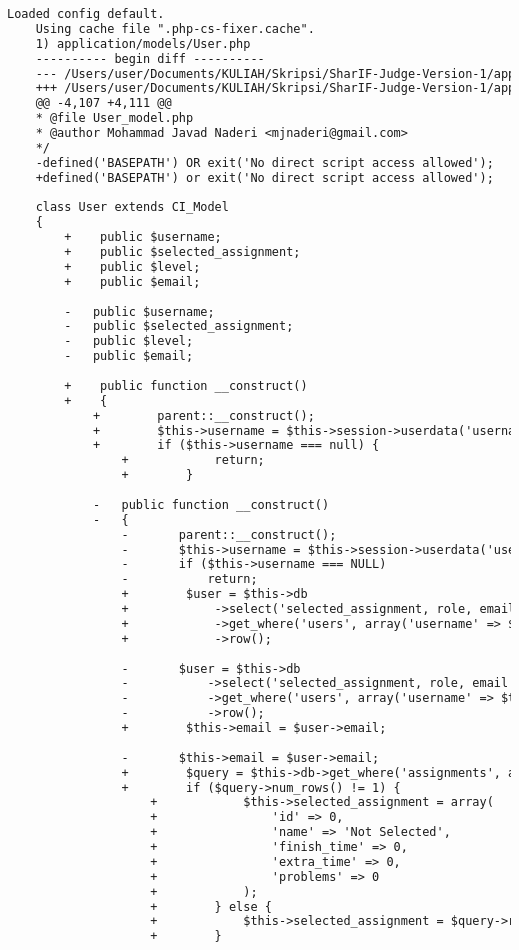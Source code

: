 \begin{lstlisting}[language=diff, caption=Perubahan pada kode User.php]
	Loaded config default.
	Using cache file ".php-cs-fixer.cache".
	1) application/models/User.php
	---------- begin diff ----------
	--- /Users/user/Documents/KULIAH/Skripsi/SharIF-Judge-Version-1/application/models/User.php
	+++ /Users/user/Documents/KULIAH/Skripsi/SharIF-Judge-Version-1/application/models/User.php
	@@ -4,107 +4,111 @@
	* @file User_model.php
	* @author Mohammad Javad Naderi <mjnaderi@gmail.com>
	*/
	-defined('BASEPATH') OR exit('No direct script access allowed');
	+defined('BASEPATH') or exit('No direct script access allowed');
	
	class User extends CI_Model
	{
		+    public $username;
		+    public $selected_assignment;
		+    public $level;
		+    public $email;
		
		-	public $username;
		-	public $selected_assignment;
		-	public $level;
		-	public $email;
		
		+    public function __construct()
		+    {
			+        parent::__construct();
			+        $this->username = $this->session->userdata('username');
			+        if ($this->username === null) {
				+            return;
				+        }
			
			-	public function __construct()
			-	{
				-		parent::__construct();
				-		$this->username = $this->session->userdata('username');
				-		if ($this->username === NULL)
				-			return;
				+        $user = $this->db
				+            ->select('selected_assignment, role, email')
				+            ->get_where('users', array('username' => $this->username))
				+            ->row();
				
				-		$user = $this->db
				-			->select('selected_assignment, role, email')
				-			->get_where('users', array('username' => $this->username))
				-			->row();
				+        $this->email = $user->email;
				
				-		$this->email = $user->email;
				+        $query = $this->db->get_where('assignments', array('id' => $user->selected_assignment));
				+        if ($query->num_rows() != 1) {
					+            $this->selected_assignment = array(
					+                'id' => 0,
					+                'name' => 'Not Selected',
					+                'finish_time' => 0,
					+                'extra_time' => 0,
					+                'problems' => 0
					+            );
					+        } else {
					+            $this->selected_assignment = $query->row_array();
					+        }
				

\end{lstlisting}
